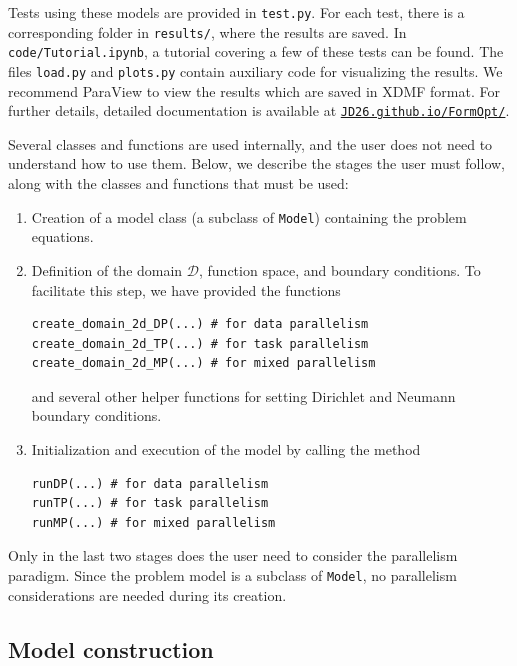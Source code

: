 \documentclass[preprint,9pt]{elsarticle}
\begin{document}
Tests using these models are provided in \texttt{test.py}.
For each test, there is a corresponding folder in \texttt{results/},
where the results are saved. 
In \texttt{code/Tutorial.ipynb}, a tutorial covering a few of these tests can be found.
The files \texttt{load.py} and \texttt{plots.py} contain auxiliary code
for visualizing the results. 
We recommend ParaView \cite{10.5555/2789330}
to view the results which are saved in XDMF format. 
For further details,
detailed documentation is available at
\href{https://JD26.github.io/FormOpt/}{\texttt{JD26.github.io/FormOpt/}}.

Several classes and functions are used internally,
and the user does not need to understand how to use them.
Below, we describe the stages the user must follow,
along with the classes and functions that must be used:
\begin{enumerate}
\item Creation of a model class (a subclass of \texttt{Model})
	containing the problem equations. 
\item Definition of the domain $\mathcal{D}$, function space,
	and boundary conditions. To facilitate this step,
	we have provided the functions
\begin{lstlisting}
create_domain_2d_DP(...) # for data parallelism
create_domain_2d_TP(...) # for task parallelism
create_domain_2d_MP(...) # for mixed parallelism
\end{lstlisting}
	and several other helper functions
	for setting Dirichlet and Neumann boundary conditions. 
\item Initialization and execution of the model
	by calling the method
\begin{lstlisting}
runDP(...) # for data parallelism
runTP(...) # for task parallelism
runMP(...) # for mixed parallelism
\end{lstlisting}
\end{enumerate}
Only in the last two stages does the user need to consider
the parallelism paradigm.
Since the problem model is a subclass of \texttt{Model},
no parallelism considerations are needed during its creation.


\subsection{Model construction}\label{sub:model}
\end{document}
